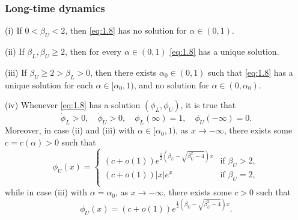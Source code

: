 \begin{frame}[allowframebreaks]
    \frametitle{Long-time dynamics}
    \begin{theorem}
        
        (i) If \(0 < \beta_U < 2\), then \eqref{eq:1.8} has no solution for \(\alpha \in (0, 1)\). 


        (ii) If \(\beta_L, \beta_U \geq 2\), then for every \(\alpha \in (0, 1)\) \eqref{eq:1.8} has a unique solution.


        (iii) If \(\beta_U \geq 2 > \beta_L > 0\), then there exists \(\alpha_0 \in (0, 1)\) such that \eqref{eq:1.8} has a unique solution for each \(\alpha \in [\alpha_0, 1)\), and no solution for \(\alpha \in (0, \alpha_0)\).

        
        (iv)  Whenever \eqref{eq:1.8} has a solution \((\phi_L, \phi_U)\), it is true that 
            \[
                \dot{\phi}_L > 0, \quad \dot{\phi}_U > 0, \quad \phi_L(\infty) = 1, \quad \phi_U(-\infty) = 0.
            \]
        \theorembreak
            Moreover, in case (ii) and (iii) with \(\alpha \in [\alpha_0, 1)\), as \(x \to -\infty\), there exists some \(c = c(\alpha) > 0\) such that
            \begin{equation}
                \phi_U(x) = \begin{cases}
                    (c + o(1))e^{\frac{1}{2}(\beta_U - \sqrt{\beta_U^2 - 4})x} & \text{if } \beta_U > 2, \\
                    (c + o(1))\lvert x\rvert e^{x} & \text{if } \beta_U = 2, \\
                \end{cases} 
                \label{eq:1.9}
            \end{equation}
            while in case (iii) with \(\alpha = \alpha_0\), as \(x \to -\infty\), there exists some \(c > 0\) such that
            \begin{equation}
                \phi_U(x) = (c + o(1))e^{\frac{1}{2}(\beta_U - \sqrt{\beta_U^2 - 4})x}.
                \label{eq:1.10}
            \end{equation}
        \label{thm:1.1}
    \end{theorem}
\end{frame}


